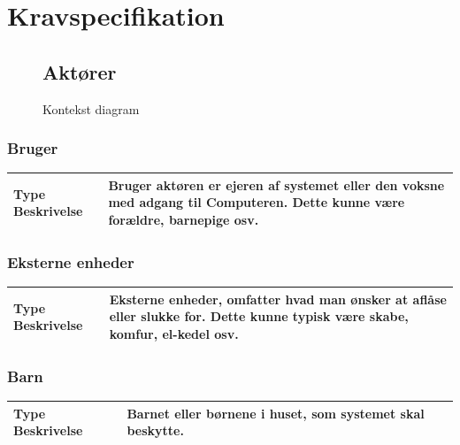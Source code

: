 \chapter{Kravspecifikation}

\begin{figure}[htbp] \centering
\section{Aktører}
\caption{Kontekst diagram}
\label{lab:kontekstdiagram}
\end{figure}

\begin{table}[!htbp] \centering
\subsection{Bruger}
\begin{tabular}{|p{4cm}|p{8cm}|}
	\hline
\textbf{Type Beskrivelse} &
Bruger aktøren er ejeren af systemet eller den voksne med adgang til Computeren.
Dette kunne være forældre, barnepige osv.	
\\\hline
	\end{tabular}
\end{table}

\begin{table}[!htbp] \centering
\subsection{Eksterne enheder}
\begin{tabular}{|p{4cm}|p{8cm}|}
	\hline
\textbf{Type Beskrivelse} &
Eksterne enheder, omfatter hvad man ønsker at aflåse eller
slukke for. Dette kunne typisk være skabe, komfur, el-kedel osv.	
\\\hline
	\end{tabular}
\end{table}

\begin{table}[!htbp] \centering
\subsection{Barn}
\begin{tabular}{|p{4cm}|p{8cm}|}
	\hline
\textbf{Type Beskrivelse} &
Barnet eller børnene i huset, som systemet skal beskytte.	
\\\hline
	\end{tabular}
\end{table}

